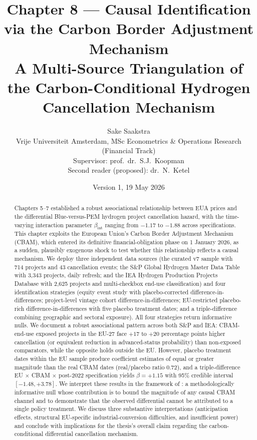 \documentclass[11pt,a4paper]{article}
\title{\textbf{Chapter 8 — Causal Identification via the Carbon Border Adjustment Mechanism}\\[0.4em]
\large A Multi-Source Triangulation of the Carbon-Conditional Hydrogen Cancellation Mechanism}
\author{Sake Saakstra \\ \small Vrije Universiteit Amsterdam, MSc Econometrics \& Operations Research (Financial Track) \\ \small Supervisor: prof.\ dr.\ S.J.\ Koopman \\ \small Second reader (proposed): dr.\ N.\ Ketel}
\date{Version 1, 19 May 2026}
\newcommand{\bint}{\beta_{\mathrm{int}}}
\begin{document}
\maketitle

\begin{abstract}
\noindent Chapters 5--7 established a robust associational relationship between EUA prices and the differential Blue-versus-PEM hydrogen project cancellation hazard, with the time-varying interaction parameter $\bint$ ranging from $-1.17$ to $-1.88$ across specifications. This chapter exploits the European Union's Carbon Border Adjustment Mechanism (CBAM), which entered its definitive financial-obligation phase on 1 January 2026, as a sudden, plausibly exogenous shock to test whether this relationship reflects a causal mechanism. We deploy three independent data sources (the curated v7 sample with 714 projects and 43 cancellation events; the S\&P Global Hydrogen Master Data Table with 3{,}343 projects, daily refresh; and the IEA Hydrogen Production Projects Database with 2{,}625 projects and multi-checkbox end-use classification) and four identification strategies (equity event study with placebo-corrected difference-in-differences; project-level vintage cohort difference-in-differences; EU-restricted placebo-rich difference-in-differences with five placebo treatment dates; and a triple-difference combining geographic and sectoral exposure). All four strategies return informative nulls. We document a robust associational pattern across both S\&P and IEA: CBAM-end-use exposed projects in the EU-27 face $+17$ to $+20$ percentage points higher cancellation (or equivalent reduction in advanced-status probability) than non-exposed comparators, while the opposite holds outside the EU. However, placebo treatment dates within the EU sample produce coefficient estimates of equal or greater magnitude than the real CBAM dates (real/placebo ratio $0.72$), and a triple-difference EU $\times$ CBAM $\times$ post-2022 specification yields $\beta = +1.15$ with 95\% credible interval $[-1.48, +3.78]$. We interpret these results in the framework of \citet{ketel2023unimportance}: a methodologically informative null whose contribution is to bound the magnitude of any causal CBAM channel and to demonstrate that the observed differential cannot be attributed to a single policy treatment. We discuss three substantive interpretations (anticipation effects, structural EU-specific industrial-conversion difficulties, and insufficient power) and conclude with implications for the thesis's overall claim regarding the carbon-conditional differential cancellation mechanism.
\end{abstract}
\end{document}
